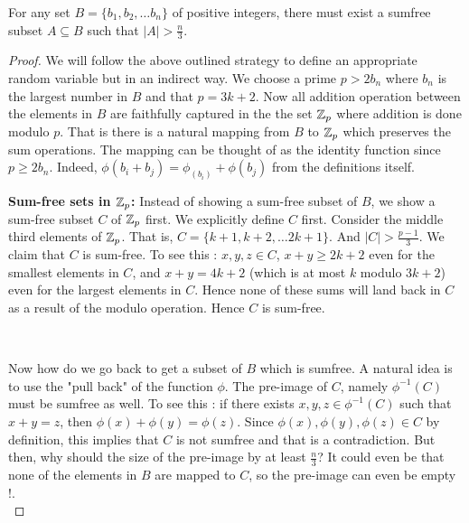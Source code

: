 \begin{theorem}
For any set $B = \{b_1,b_2, \ldots b_n\}$ of positive integers, there must exist a sumfree subset $A \subseteq B$ such that $|A| > \frac{n}{3}$.
\end{theorem}
\begin{proof}
We will follow the above outlined strategy to define an appropriate random variable but in an indirect way. We choose a prime $p > 2b_n$ where $b_n$ is the largest number in $B$ and that $p=3k+2$. Now all addition operation between the elements in $B$ are faithfully  captured in the the set ${\mathbb{Z}}_p$ where addition is done modulo $p$. That is there is a natural mapping from $B$ to ${\mathbb{Z}}_p$ which preserves the sum operations. The mapping can be thought of as the identity function since $p \ge 2b_n$. Indeed, $\phi(b_i+b_j) = \phi_(b_i)+\phi(b_j)$ from the definitions itself.

\hspace{-5mm}\begin{minipage}{0.65\linewidth}
{\bf Sum-free sets in ${\mathbb{Z}}_p$:} Instead of showing a sum-free subset of $B$, we show a sum-free subset $C$ of ${\mathbb{Z}}_p$ first. We explicitly define $C$ first. Consider the middle third elements of ${\mathbb{Z}}_p$. That is, $C = \{k+1,k+2, \ldots 2k+1\}$. And $|C| > \frac{p-1}{3}$. We claim that $C$ is sum-free. To see this : $x,y,z \in C$, $x+y \ge 2k+2$ even for the smallest elements in $C$, and $x+y = 4k+2$ (which is at most $k$ modulo $3k+2$) even for the largest elements in $C$. Hence none of these sums will land back in $C$ as a result of the modulo operation. Hence $C$ is sum-free.
\end{minipage}
\begin{minipage}{0.05\linewidth}
~
\end{minipage}
\begin{minipage}{0.25\linewidth}
\vspace{-1cm}
\end{minipage}
\vspace{4mm}

 Now how do we go back to get a subset of $B$ which is sumfree. A natural idea is to use the "pull back" of the function $\phi$. The pre-image of $C$, namely $\phi^{-1}(C)$ must be sumfree as well. To see this : if there exists $x, y, z \in \phi^{-1}(C)$  such that $x+y = z$, then $\phi(x)+\phi(y) = \phi(z)$. Since $\phi(x),\phi(y),\phi(z) \in C$ by definition, this implies that $C$ is not sumfree and that is a contradiction. But then, why should the size of the pre-image by at least $\frac{n}{3}$? It could even be that none of the elements in $B$ are mapped to $C$, so the pre-image can even be empty !.\\[-3mm]


\end{proof}
